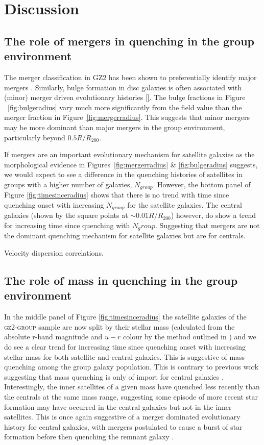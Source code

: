 \documentclass[useAMS,usenatbib]{mn2e}
\begin{document}
\section{Discussion}\label{sec:disc}

\subsection{The role of mergers in quenching in the group environment}\label{sec:rolemergerenv}

The merger classification in GZ2 has been shown to preferentially identify major mergers \citep{darg10a}. Similarly, bulge formation in disc galaxies is often associated with (minor) merger driven evolutionary histories \ref{}.  The bulge fractions in Figure ~\ref{fig:bulgeradius} vary much more significantly from the field value than the merger fraction in Figure~\ref{fig:mergerradius}. This suggests that minor mergers may be more dominant than major mergers in the group environment, particularly beyond $0.5 R/R_{200}$. 

If mergers are an important evolutionary mechanism for satellite galaxies as the morphological evidence in Figures~\ref{fig:mergerradius} \& \ref{fig:bulgeradius} suggests, we would expect to see a difference in the quenching histories of satellites in groups with a higher number of galaxies, $N_{group}$. However, the bottom panel of Figure \ref{fig:timesinceradius} shows that there is no trend with time since quenching onset with increasing $N_{group}$ for the satellite galaxies. The central galaxies (shown by the square points at $\sim 0.01 R/R_{200}$) however, do show a trend for increasing time since quenching with $N_group$. Suggesting that mergers are not the dominant quenching mechanism for satellite galaxies but are for centrals.  

Velocity dispersion correlations. 

\subsection{The role of mass in quenching in the group environment}\label{sec:rolemassenv}


In the middle panel of Figure \ref{fig:timesinceradius} the satellite galaxies of the \textsc{gz2-group} sample are now split by their stellar mass (calculated from the absolute r-band magnitude and $u-r$ colour by the method outlined in \citealt{baldry06}) and we do see a clear trend for increasing time since quenching onset with increasing stellar mass for both satellite and central galaxies. This is suggestive of mass quenching among the group galaxy population. This is contrary to previous work suggesting that mass quenching is only of import for central galaxies \citep{ref, ref, ref}. Interestingly, the inner satellites of a given mass have quenched less recently than the centrals at the same mass range, suggesting some episode of more recent star formation may have occurred in the central galaxies but not in the inner satellites. This is once again suggestive of a merger dominated evolutionary history for central galaxies, with mergers postulated to cause a burst of star formation before then quenching the remnant galaxy \citep{?,?, pontzen16}. 
\end{document}
